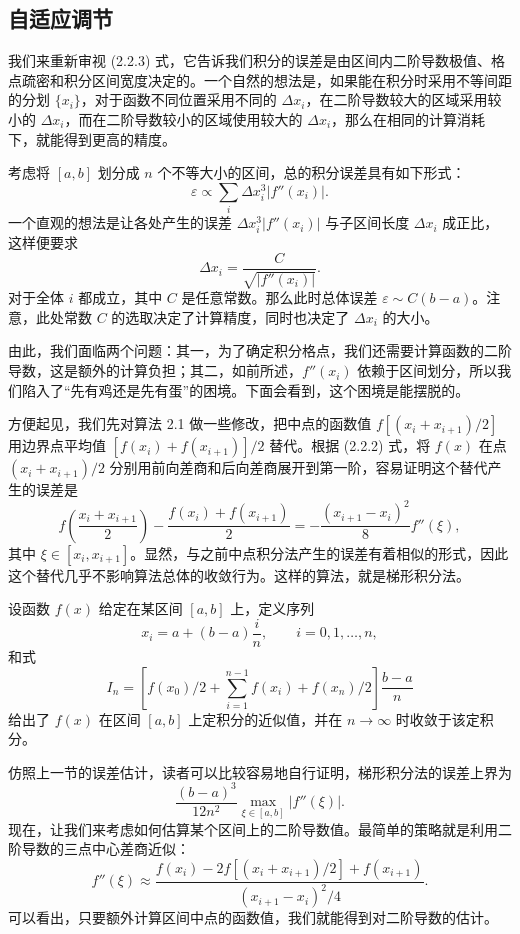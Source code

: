 \subsection{自适应调节}

我们来重新审视 (2.2.3) 式，它告诉我们积分的误差是由区间内二阶导数极值、格点疏密和积分区间宽度决定的。一个自然的想法是，如果能在积分时采用不等间距的分划 $\{x_i\}$，对于函数不同位置采用不同的 $\Delta x_i$，在二阶导数较大的区域采用较小的 $\Delta x_i$，而在二阶导数较小的区域使用较大的 $\Delta x_i$，那么在相同的计算消耗下，就能得到更高的精度。

考虑将 $[a,b]$ 划分成 $n$ 个不等大小的区间，总的积分误差具有如下形式：
\[
\varepsilon\propto\sum_i\Delta x_i^3|f''(x_i)|.
\]
一个直观的想法是让各处产生的误差 $\Delta x_i^3|f''(x_i)|$ 与子区间长度 $\Delta x_i$ 成正比，这样便要求
\begin{equation}
\Delta x_i=\frac{C}{\sqrt{|f''(x_i)|}}.
\tag{2.2.7}
\end{equation}
对于全体 $i$ 都成立，其中 $C$ 是任意常数。那么此时总体误差 $\varepsilon\sim C(b-a)$。注意，此处常数 $C$ 的选取决定了计算精度，同时也决定了 $\Delta x_i$ 的大小。

由此，我们面临两个问题：其一，为了确定积分格点，我们还需要计算函数的二阶导数，这是额外的计算负担；其二，如前所述，$f''(x_i)$ 依赖于区间划分，所以我们陷入了“先有鸡还是先有蛋”的困境。下面会看到，这个困境是能摆脱的。

方便起见，我们先对算法 2.1 做一些修改，把中点的函数值 $f[(x_i+x_{i+1})/2]$ 用边界点平均值 $[f(x_i)+f(x_{i+1})]/2$ 替代。根据 (2.2.2) 式，将 $f(x)$ 在点 $(x_i+x_{i+1})/2$ 分别用前向差商和后向差商展开到第一阶，容易证明这个替代产生的误差是
\[
f\left(\frac{x_i+x_{i+1}}2\right)-\frac{f(x_i)+f(x_{i+1})}{2}
=-\frac{(x_{i+1}-x_i)^2}{8}f''(\xi),
\]
其中 $\xi\in[x_i,x_{i+1}]$。显然，与之前中点积分法产生的误差有着相似的形式，因此这个替代几乎不影响算法总体的收敛行为。这样的算法，就是梯形积分法。

\begin{algorithmBox}
设函数 $f(x)$ 给定在某区间 $[a,b]$ 上，定义序列
\[
x_i=a+(b-a)\frac{i}{n},\qquad i=0,1,\ldots,n,
\]
和式
\[
I_n=\left[f(x_0)/2+\sum_{i=1}^{n-1}f(x_i)+f(x_n)/2\right]\frac{b-a}{n}
\]
给出了 $f(x)$ 在区间 $[a,b]$ 上定积分的近似值，并在 $n\to\infty$ 时收敛于该定积分。
\end{algorithmBox}

仿照上一节的误差估计，读者可以比较容易地自行证明，梯形积分法的误差上界为
\[
\frac{(b-a)^3}{12n^2}\max_{\xi\in[a,b]}|f''(\xi)|.
\]
现在，让我们来考虑如何估算某个区间上的二阶导数值。最简单的策略就是利用二阶导数的三点中心差商近似：
\begin{equation}
f''(\xi)\approx\frac{f(x_i)-2f[(x_i+x_{i+1})/2]+f(x_{i+1})}{(x_{i+1}-x_i)^2/4}.
\tag{2.2.8}
\end{equation}
可以看出，只要额外计算区间中点的函数值，我们就能得到对二阶导数的估计。

